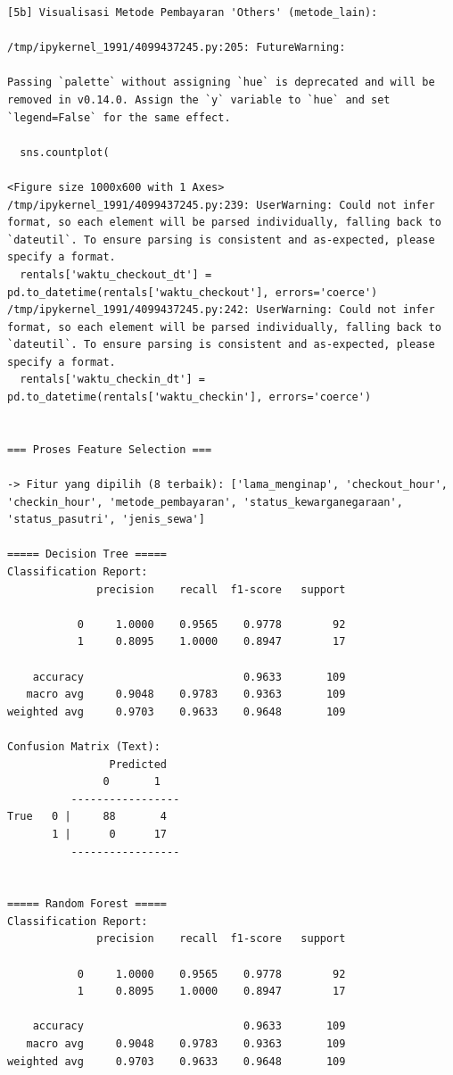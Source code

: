 \begin{lstlisting}[caption={Output 14}]
[5b] Visualisasi Metode Pembayaran 'Others' (metode_lain):

/tmp/ipykernel_1991/4099437245.py:205: FutureWarning: 

Passing `palette` without assigning `hue` is deprecated and will be removed in v0.14.0. Assign the `y` variable to `hue` and set `legend=False` for the same effect.

  sns.countplot(

<Figure size 1000x600 with 1 Axes>
/tmp/ipykernel_1991/4099437245.py:239: UserWarning: Could not infer format, so each element will be parsed individually, falling back to `dateutil`. To ensure parsing is consistent and as-expected, please specify a format.
  rentals['waktu_checkout_dt'] = pd.to_datetime(rentals['waktu_checkout'], errors='coerce')
/tmp/ipykernel_1991/4099437245.py:242: UserWarning: Could not infer format, so each element will be parsed individually, falling back to `dateutil`. To ensure parsing is consistent and as-expected, please specify a format.
  rentals['waktu_checkin_dt'] = pd.to_datetime(rentals['waktu_checkin'], errors='coerce')


=== Proses Feature Selection ===

-> Fitur yang dipilih (8 terbaik): ['lama_menginap', 'checkout_hour', 'checkin_hour', 'metode_pembayaran', 'status_kewarganegaraan', 'status_pasutri', 'jenis_sewa']

===== Decision Tree =====
Classification Report:
              precision    recall  f1-score   support

           0     1.0000    0.9565    0.9778        92
           1     0.8095    1.0000    0.8947        17

    accuracy                         0.9633       109
   macro avg     0.9048    0.9783    0.9363       109
weighted avg     0.9703    0.9633    0.9648       109

Confusion Matrix (Text):
                Predicted
               0       1
          -----------------
True   0 |     88       4
       1 |      0      17
          -----------------


===== Random Forest =====
Classification Report:
              precision    recall  f1-score   support

           0     1.0000    0.9565    0.9778        92
           1     0.8095    1.0000    0.8947        17

    accuracy                         0.9633       109
   macro avg     0.9048    0.9783    0.9363       109
weighted avg     0.9703    0.9633    0.9648       109


\end{lstlisting}
